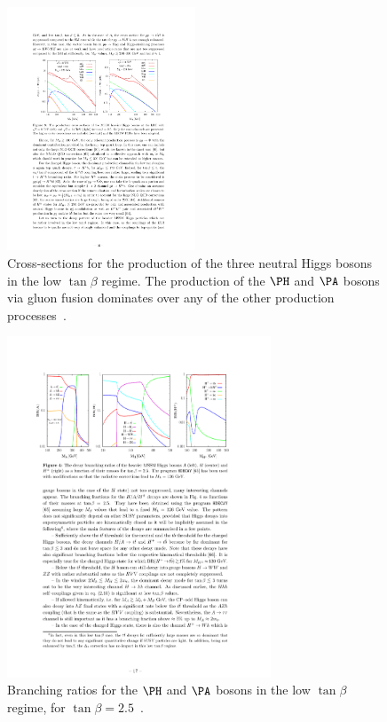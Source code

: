 \begin{figure}[htbp]
   \includegraphics[width=0.5\textwidth]{plots/theory/XS_lowtanb.pdf}
\caption[Cross-sections for the production of the three neutral Higgs bosons in
the low $\tan\beta$ regime.]{Cross-sections for the production of the three neutral Higgs bosons in
the low $\tan\beta$ regime. The production of the $\PH$ and $\PA$ bosons
via gluon fusion dominates over any of the other production processes~\cite{Djouadi:2013vqa}.}
\label{fig:XSlowtanb}
\end{figure}

\begin{figure}[htbp]
   \includegraphics[width=0.7\textwidth]{plots/theory/BR_lowtanb.pdf}
\caption[Branching ratios for the $\PH$ and $\PA$ bosons in the low $\tan\beta$
regime.]{Branching ratios for the $\PH$ and $\PA$ bosons in the low $\tan\beta$
regime, for $\tan\beta=2.5$~\cite{Djouadi:2013vqa}.}
\label{fig:BRlowtanb}
\end{figure}

